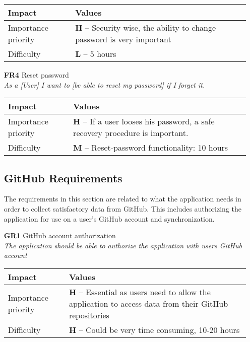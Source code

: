 \begin{itemize}
        \begin{tabular}{| l | p{7cm} |}
            \hline
            \rowcolor[gray]{0.8}
            \textbf{Impact} & \textbf{Values} \\
            \hline
            Importance priority & \textbf{H} -- Security wise, the ability to change password is very important\\
            Difficulty & \textbf{L} -- 5 hours \\
            \hline
        \end{tabular}
    \vspace{0.5cm}

    \item[\textbf{FR4}] Reset password \\
        \textit{\small{As a [User] I want to [be able to reset my password] if I forget it.}}

        \begin{tabular}{| l | p{7cm} |}
            \hline
            \rowcolor[gray]{0.8}
            \textbf{Impact} & \textbf{Values} \\
            \hline
            Importance priority & \textbf{H} -- If a user looses his password, a safe recovery procedure is important.\\
            Difficulty & \textbf{M} -- Reset-password functionality: 10 hours \\
            \hline
        \end{tabular}
    \vspace{0.5cm}

\subsection{GitHub Requirements}
The requirements in this section are related to what the application needs in order to collect satisfactory data from GitHub. This includes authorizing the application for use on a user's GitHub account and synchronization. 
    \item[\textbf{GR1}] GitHub account authorization\\
        \textit{\small{The application should be able to authorize the application with users GitHub account}}

        \begin{tabular}{| l | p{7cm} |}
            \hline
            \rowcolor[gray]{0.8}
            \textbf{Impact} & \textbf{Values} \\
            \hline
            Importance priority & \textbf{H} -- Essential as users need to allow the application to access data from their GitHub repositories\\
            Difficulty & \textbf{H} -- Could be very time consuming, 10-20 hours \\
            \hline
        \end{tabular}
    \vspace{0.5cm}


\end{itemize}
